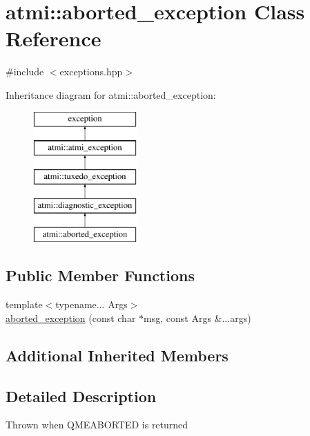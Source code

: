 \hypertarget{classatmi_1_1aborted__exception}{\section{atmi\+:\+:aborted\+\_\+exception Class Reference}
\label{classatmi_1_1aborted__exception}
}


{\ttfamily \#include $<$exceptions.\+hpp$>$}

Inheritance diagram for atmi\+:\+:aborted\+\_\+exception\+:\begin{figure}[H]
\begin{center}
\leavevmode
\includegraphics[height=5.000000cm]{classatmi_1_1aborted__exception}
\end{center}
\end{figure}
\subsection*{Public Member Functions}
\begin{DoxyCompactItemize}
\item 
{\footnotesize template$<$typename... Args$>$ }\\\hyperlink{classatmi_1_1aborted__exception_ab2a2defdbafa60f2566c55a078bc502a}{aborted\+\_\+exception} (const char $\ast$msg, const Args \&...args)
\end{DoxyCompactItemize}
\subsection*{Additional Inherited Members}


\subsection{Detailed Description}
Thrown when Q\+M\+E\+A\+B\+O\+R\+T\+E\+D is returned 


